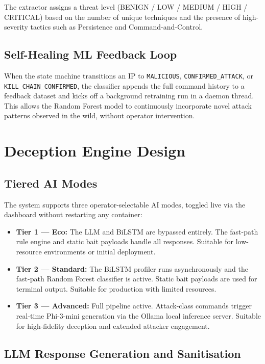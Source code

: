 The extractor assigns a threat level (BENIGN / LOW / MEDIUM / HIGH / CRITICAL) based on the number of unique techniques and the presence of high-severity tactics such as Persistence and Command-and-Control.

\subsection{Self-Healing ML Feedback Loop}

When the state machine transitions an IP to \texttt{MALICIOUS}, \texttt{CONFIRMED\_ATTACK}, or \texttt{KILL\_CHAIN\_CONFIRMED}, the classifier appends the full command history to a feedback dataset and kicks off a background retraining run in a daemon thread. This allows the Random Forest model to continuously incorporate novel attack patterns observed in the wild, without operator intervention.

\section{Deception Engine Design}

\subsection{Tiered AI Modes}

The system supports three operator-selectable AI modes, toggled live via the dashboard without restarting any container:

\begin{itemize}
    \item \textbf{Tier 1 — Eco:} The LLM and BiLSTM are bypassed entirely. The fast-path rule engine and static bait payloads handle all responses. Suitable for low-resource environments or initial deployment.
    \item \textbf{Tier 2 — Standard:} The BiLSTM profiler runs asynchronously and the fast-path Random Forest classifier is active. Static bait payloads are used for terminal output. Suitable for production with limited resources.
    \item \textbf{Tier 3 — Advanced:} Full pipeline active. Attack-class commands trigger real-time Phi-3-mini generation via the Ollama local inference server. Suitable for high-fidelity deception and extended attacker engagement.
\end{itemize}

\subsection{LLM Response Generation and Sanitisation}

